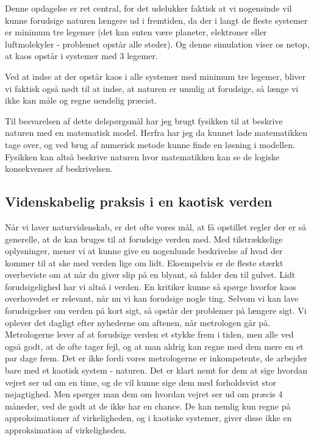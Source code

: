 \documentclass[12pt,a4paper]{article}
\theoremstyle{break}
\theoremstyle{nonumberplain}
\begin{document}
Denne opdagelse er ret central, for det udelukker faktisk at vi nogensinde vil kunne forudsige naturen længere ud i fremtiden, da der i langt de fleste systemer er minimum tre legemer (det kan enten være planeter, elektroner eller luftmolekyler - problemet opstår alle steder). 
Og denne simulation viser os netop, at kaos opstår i systemer med 3 legemer.

Ved at indse at der opstår kaos i alle systemer med minimum tre legemer, bliver vi faktisk også nødt til at indse, at naturen er umulig at forudsige, så længe vi ikke kan måle og regne uendelig præcist.

Til besvarelsen af dette delspørgsmål har jeg brugt fysikken til at beskrive naturen med en matematisk model. 
Herfra har jeg da kunnet lade matematikken tage over, og ved brug af numerisk metode kunne finde en løsning i modellen. 
Fysikken kan altså beskrive naturen hvor matematikken kan se de logiske konsekvenser af beskrivelsen.

\subsection{Videnskabelig praksis i en kaotisk verden}
Når vi laver naturvidenskab, er det ofte vores mål, at få opstillet regler der er så generelle, at de kan bruges til at forudsige verden med. 
Med tilstrækkelige oplysninger, mener vi at kunne give en nogenlunde beskrivelse af hvad der kommer til at ske med verden lige om lidt.
Eksempelvis er de fleste stærkt overbeviste om at når du giver slip på en blyant, så falder den til gulvet. 
Lidt forudsigelighed har vi altså i verden. 
En kritiker kunne så spørge hvorfor kaos overhovedet er relevant, når nu vi kan forudsige nogle ting. 
Selvom vi kan lave forudsigelser om verden på kort sigt, så opstår der problemer på længere sigt. 
Vi oplever det dagligt efter nyhederne om aftenen, når metrologen går på. 
Metrologerne lever af at forudsige verden et stykke frem i tiden, men alle ved også godt, at de ofte tager fejl, og at man aldrig kan regne med dem mere en et par dage frem. 
Det er ikke fordi vores metrologerne er inkompetente, de arbejder bare med et kaotisk system - naturen.
Det er klart nemt for dem at sige hvordan vejret ser ud om en time, og de vil kunne sige dem med forholdsvist stor nøjagtighed. 
Men spørger man dem om hvordan vejret ser ud om præcis 4 måneder, ved de godt at de ikke har en chance. 
De kan nemlig kun regne på approksimationer af virkeligheden, og i kaotiske systemer, giver disse ikke en approksimation af virkeligheden.
\end{document}
